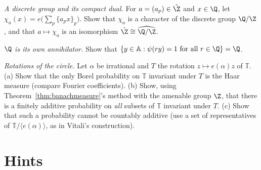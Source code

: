 \begin{exercise}[$\star\star$]\label{ex:qzdual}
\emph{A discrete group and its compact dual.} For $a=(a_p)\in\hat{\Z}$ and $x\in\Q$, let $\chi_a(x)=e\bigl(\sum_p\{a_px\}_p\bigr)$. Show that $\chi_a$ is a character of the discrete group $\Q/\Z$, and that
$a\mapsto\chi_a$ is an isomorphism $\hat{\Z}\cong\widehat{\Q/\Z}$.
\end{exercise}

\begin{exercise}[$\star\star\star$]\label{ex:qperp}
\emph{$\Q$ is its own annihilator.} Show that $\{y\in\mathbb A:\psi(ry)=1\text{ for all }r\in\Q\}=\Q$.
\end{exercise}

\begin{exercise}[$\star\star$]\label{ex:circlerotation}
\emph{Rotations of the circle.} Let $\alpha$ be irrational and $T$ the rotation $z\mapsto e(\alpha)z$ of $\mathbb T$. (a) Show that the only Borel probability on $\mathbb T$ invariant under $T$ is
the Haar measure (compare Fourier coefficients). (b) Show, using Theorem~\ref{thm:banachmeasure}'s method with the amenable group $\Z$, that there is a finitely additive
probability on \emph{all} subsets of $\mathbb T$ invariant under $T$. (c) Show that such a probability cannot be countably additive (use a set of representatives of
$\mathbb T/\langle e(\alpha)\rangle$, as in Vitali's construction).
\end{exercise}

\section{Hints}

